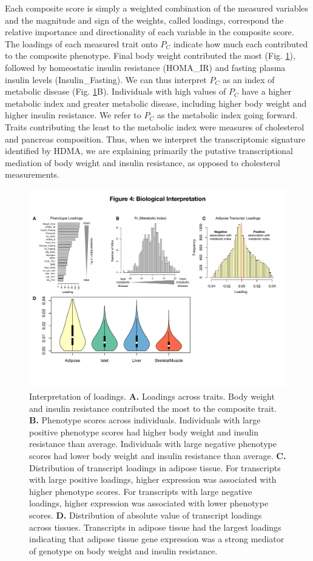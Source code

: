 \documentclass[
]{article}
\begin{document}
Each composite score is simply a weighted combination of the measured
variables and the magnitude and sign of the weights, called loadings,
correspond the relative importance and directionality of each variable
in the composite score. The loadings of each measured trait onto \(P_C\)
indicate how much each contributed to the composite phenotype. Final
body weight contributed the most (Fig. \ref{fig:interpretation}),
followed by homeostatic insulin resistance (HOMA\_IR) and fasting plasma
insulin levels (Insulin\_Fasting). We can thus interpret \(P_C\) as an
index of metabolic disease (Fig. \ref{fig:interpretation}B). Individuals
with high values of \(P_C\) have a higher metabolic index and greater
metabolic disease, including higher body weight and higher insulin
resistance. We refer to \(P_C\) as the metabolic index going forward.
Traits contributing the least to the metabolic index were measures of
cholesterol and pancreas composition. Thus, when we interpret the
transcriptomic signature identified by HDMA, we are explaining primarily
the putative transcriptional mediation of body weight and insulin
resistance, as opposed to cholesterol measurements.

\begin{figure}[ht!]
\includegraphics[width=\textwidth]{Figures/Fig4_interpretation.pdf} 
\caption{Interpretation of loadings. \textbf{A.} Loadings 
across traits. Body weight and insulin resistance contributed 
the most to the composite trait. \textbf{B.} Phenotype scores 
across individuals. Individuals with large positive phenotype 
scores had higher body weight and insulin resistance than average. 
Individuals with large negative phenotype scores had lower body 
weight and insulin resistance than average. \textbf{C.} 
Distribution of transcript loadings in adipose tissue. For 
transcripts with large positive loadings, higher expression was 
associated with higher phenotype scores. For transcripts with 
large negative loadings, higher expression was associated with 
lower phenotype scores. \textbf{D.} Distribution of absolute 
value of transcript loadings across tissues. Transcripts in 
adipose tissue had the largest loadings indicating that 
adipose tissue gene expression was a strong mediator of 
genotype on body weight and insulin resistance.
}
\label{fig:interpretation}
\end{figure}
\end{document}

